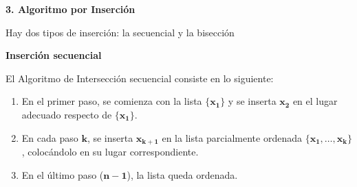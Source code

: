 \documentclass[twoside]{report}
\newcommand{\bs}[1]{\boldsymbol{#1}}
\begin{document}
\vspace*{0.5cm}

\textbf{3. Algoritmo por Inserci\'{o}n}
\vspace*{0.2cm}

Hay dos tipos de inserci\'{o}n: la secuencial y la bisecci\'{o}n
\vspace{0.5cm}

\textbf{Inserci\'{o}n secuencial}
\vspace{0.2cm}

 El Algoritmo de Intersecci\'{o}n secuencial consiste en lo siguiente:

        \begin{enumerate}
            \item En el primer paso, se comienza con la lista $\bs{\{x_1\}}$ y se inserta $\bs{x_2}$ en el lugar adecuado respecto de $\bs{\{x_1\}}$.
            \item En cada paso $\bs{k}$, se inserta $\bs{x_{k+1}}$ en la lista parcialmente ordenada $\bs{\{x_1,\ldots,x_k\}}$, coloc\'{a}ndolo en su lugar correspondiente.
            \item En el \'{u}ltimo paso ($\bs{n-1}$), la lista queda ordenada.
        \end{enumerate}

 \vspace{0.6cm}
%
%
%
%
%
%
%
%


\vspace{0.5cm}
\end{document}
